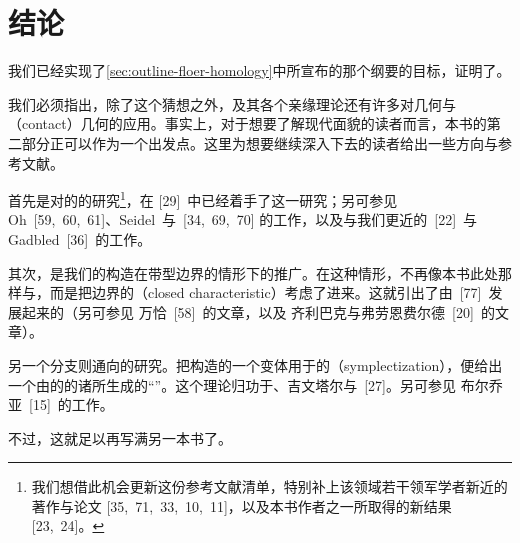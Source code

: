 
\section{结论}
\label{sec:conclusion}

我们已经实现了\cref{sec:outline-floer-homology}中所宣布的那个纲要的目标，证明了\trArnoldConjecture。

我们必须指出，除了这个猜想之外，\trFloerHomology{}及其各个亲缘理论还有许多对\trSymplectic{}几何与\textbf{\trContact}（contact）几何的应用。事实上，对于想要了解\trSymplectic\trTopology{}现代面貌的读者而言，本书的第二部分正可以作为一个出发点。这里为想要继续深入下去的读者给出一些方向与参考文献。

首先是对\trSymplectic\trManifold{}的\trLagrange{}\trSubmanifold{}的研究\footnote{我们想借此机会更新这份参考文献清单，特别补上该领域若干领军学者新近的著作与论文 [35,~71,~33,~10,~11]，以及本书作者之一所取得的新结果 [23,~24]。}，\trFloer{}在 [29]~中已经着手了这一研究；另可参见 Oh~[59,~60,~61]、Seidel~与\trFukaya{}~[34,~69,~70] 的工作，以及与我们更近的\trDamian{}~[22]~与 Gadbled~[36]~的工作。

其次，是我们的构造在带\trContact{}型边界的\trSymplectic\trManifold{}情形下的推广。在这种情形，\trFloerHomology{}不再像本书此处那样与\trMorseHomology{}\trIsomorphic，而是把边界的\textbf{\trClosedCharacteristic}（closed characteristic）考虑了进来。这就引出了由\trViterbo{}~[77]~发展起来的\trSymplectic\trHomology{}（另可参见 万恰~[58]~的文章，以及 齐利巴克与弗劳恩费尔德~[20]~的文章）。

另一个分支则通向\trContact\trManifold{}的研究。把\trFloer{}构造的一个变体用于\trContact\trManifold{}的\textbf{\trSymplectization}（symplectization），便给出一个由\trManifold{}的\trReeb{}\trVectorField{}的诸\trPeriodic\trTrajectory{}所生成的“\trContact{}\trHomology”。这个理论归功于\trEliashberg{}、吉文塔尔与\trHofer{}~[27]。另可参见 布尔乔亚~[15]~的工作。

不过，这就足以再写满另一本书了。
